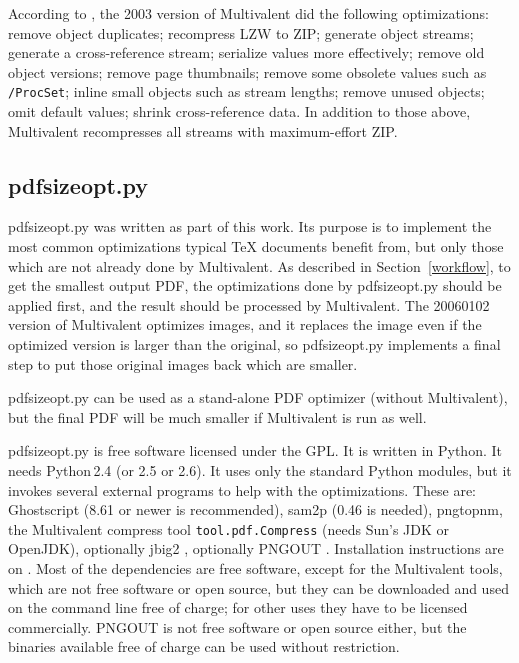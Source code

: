 \documentclass{ltugproc}
\def\cmd{\textsf}
\begin{document}
According to \cite{pdf-diet}, the 2003 version of Multivalent did the
following optimizations:
remove object duplicates;
recompress LZW to ZIP;
generate object streams;
generate a cross-reference stream;
serialize values more effectively;
remove old object versions;
remove page thumbnails;
remove some obsolete values such as \texttt{/ProcSet};
inline small objects such as stream lengths;
remove unused objects;
omit default values;
shrink cross-reference data.
In addition to those above, Multivalent recompresses all streams with
maximum-effort ZIP.



\subsection{pdfsizeopt.py}

\cmd{pdfsizeopt.py} \cite{pdfsizeopt} was written as part of this work. Its purpose is to
implement the most common optimizations typical \TeX{} documents benefit
from, but only those which are not already done by Multivalent. As described
in Section~\ref{workflow}, to get the smallest output PDF, the optimizations
done by \cmd{pdfsizeopt.py} should be applied first, and the result should
be processed by Multivalent. The 20060102 version of Multivalent
optimizes images, and it replaces the image even if the optimized version is
larger than the original, so \cmd{pdfsizeopt.py} implements a final step
to put those original images back which are smaller. 

\cmd{pdfsizeopt.py} can be used as a stand-alone PDF optimizer (without
Multivalent), but the final PDF will be much smaller if Multivalent
is run as well.

\cmd{pdfsizeopt.py} is free software licensed under the GPL. It is written
in Python. It needs Python\,2.4 (or 2.5 or 2.6). It uses only the standard
Python modules, but it invokes several external programs to help with the
optimizations. These are: Ghostscript (8.61 or newer is recommended),
\cmd{sam2p} \cite{sam2p} (0.46 is needed), pngtopnm,
the Multivalent compress tool \texttt{tool.pdf.Compress}
\cite{multivalent-compress-tool} (needs Sun's JDK or OpenJDK), 
optionally \cmd{jbig2} \cite{jbig2enc}, optionally PNGOUT \cite{pngout}.
Installation instructions are on \cite{pdfsizeopt-install}. Most of the
dependencies are free software, except for the Multivalent tools, which
are not free software or open source, but they can be downloaded and used on
the command line free of charge; for other uses they have to be licensed
commercially. PNGOUT is not free software or open source either, but the
binaries available free of charge can be used without restriction.
\end{document}
